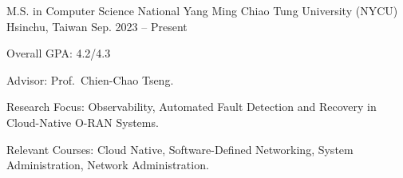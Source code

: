 

\begin{cventries}

  \cventry
    {M.S. in Computer Science} %
    {National Yang Ming Chiao Tung University (NYCU)} %
    {Hsinchu, Taiwan} %
    {Sep. 2023 -- Present} %
    {
      \begin{cvitems} %
        \item {Overall GPA: 4.2/4.3}
        \item {Advisor: Prof.~Chien-Chao Tseng.} 
        \item {Research Focus: Observability, Automated Fault Detection and Recovery in Cloud-Native O-RAN Systems.}
        \item {Relevant Courses: Cloud Native, Software-Defined Networking, System Administration, Network Administration.}
      \end{cvitems}
    }

\end{cventries}
